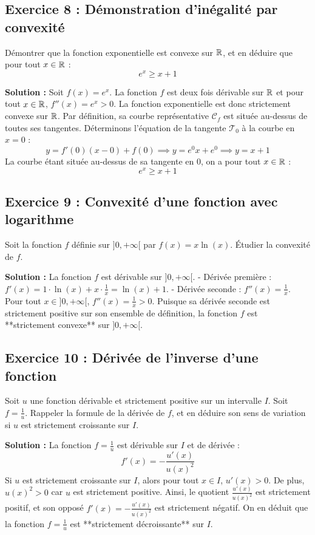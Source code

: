 \subsection*{Exercice 8 : Démonstration d'inégalité par convexité}
Démontrer que la fonction exponentielle est convexe sur $\mathbb{R}$, et en déduire que pour tout $x \in \mathbb{R}$ :
\[
e^x \ge x + 1
\]

\textbf{Solution :}
Soit $f(x) = e^x$. La fonction $f$ est deux fois dérivable sur $\mathbb{R}$ et pour tout $x \in \mathbb{R}$, $f''(x) = e^x > 0$.
La fonction exponentielle est donc strictement convexe sur $\mathbb{R}$.
Par définition, sa courbe représentative $\mathcal{C}_f$ est située au-dessus de toutes ses tangentes.
Déterminons l'équation de la tangente $\mathcal{T}_0$ à la courbe en $x=0$ :
\[
y = f'(0)(x-0) + f(0) \implies y = e^0 x + e^0 \implies y = x + 1
\]
La courbe étant située au-dessus de sa tangente en 0, on a pour tout $x \in \mathbb{R}$ :
\[
e^x \ge x + 1
\]

\subsection*{Exercice 9 : Convexité d'une fonction avec logarithme}
Soit la fonction $f$ définie sur $]0, +\infty[$ par $f(x) = x \ln(x)$. Étudier la convexité de $f$.

\textbf{Solution :}
La fonction $f$ est dérivable sur $]0, +\infty[$.
- Dérivée première : $f'(x) = 1 \cdot \ln(x) + x \cdot \frac{1}{x} = \ln(x) + 1$.
- Dérivée seconde : $f''(x) = \frac{1}{x}$.
Pour tout $x \in ]0, +\infty[$, $f''(x) = \frac{1}{x} > 0$.
Puisque sa dérivée seconde est strictement positive sur son ensemble de définition, la fonction $f$ est **strictement convexe** sur $]0, +\infty[$.

\subsection*{Exercice 10 : Dérivée de l'inverse d'une fonction}
Soit $u$ une fonction dérivable et strictement positive sur un intervalle $I$. Soit $f = \frac{1}{u}$.
Rappeler la formule de la dérivée de $f$, et en déduire son sens de variation si $u$ est strictement croissante sur $I$.

\textbf{Solution :}
La fonction $f = \frac{1}{u}$ est dérivable sur $I$ et de dérivée :
\[
f'(x) = -\frac{u'(x)}{u(x)^2}
\]
Si $u$ est strictement croissante sur $I$, alors pour tout $x \in I$, $u'(x) > 0$.
De plus, $u(x)^2 > 0$ car $u$ est strictement positive.
Ainsi, le quotient $\frac{u'(x)}{u(x)^2}$ est strictement positif, et son opposé $f'(x) = -\frac{u'(x)}{u(x)^2}$ est strictement négatif.
On en déduit que la fonction $f = \frac{1}{u}$ est **strictement décroissante** sur $I$.

